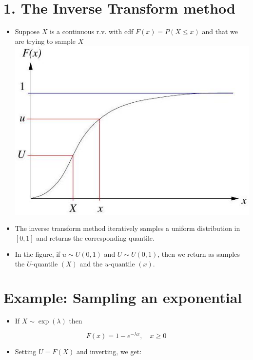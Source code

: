 \documentclass[10pt]{article}
\begin{document}
\section*{1. The Inverse Transform method}
\begin{itemize}
  \item Suppose $X$ is a continuous r.v. with cdf $F(x)=P(X \leq x)$ and that we are trying to sample $X$\\
\includegraphics[max width=\textwidth, center]{2025_05_12_520db7cd238ba7b44f0fg-35}
  \item The inverse transform method iteratively samples a uniform distribution in $[0,1]$ and returns the corresponding quantile.
  \item In the figure, if $u \sim U(0,1)$ and $U \sim U(0,1)$, then we return as samples the $U$-quantile $(X)$ and the $u$-quantile $(x)$.
\end{itemize}

\section*{Example: Sampling an exponential}
\begin{itemize}
  \item If $X \sim \exp (\lambda)$ then
\end{itemize}

$$
F(x)=1-e^{-\lambda x}, \quad x \geq 0
$$

\begin{itemize}
  \item Setting $U=F(X)$ and inverting, we get:
\end{itemize}
\end{document}
